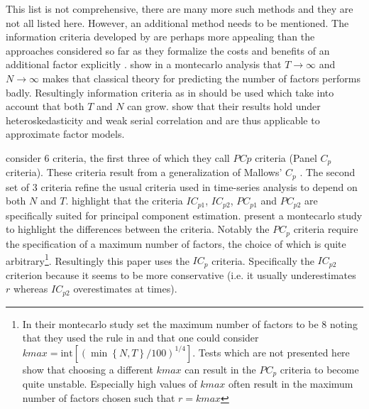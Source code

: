\documentclass[12pt]{article}
\begin{document}
This list is not comprehensive, there are many more such methods and they are not all listed here. However, an additional method needs to be mentioned. The information criteria developed by \citet{bai2002determining} are perhaps more appealing than the approaches considered so far as they formalize the costs and benefits of an additional factor explicitly \citep{stock2011dynamic}. \citet{cragg1997inferring} show in a montecarlo analysis that $T\rightarrow\infty$ and $N\rightarrow\infty$ makes that classical theory for predicting the number of factors performs badly. Resultingly information criteria as in \citet{bai2002determining} should be used which take into account that both $T$ and $N$ can grow. \citet{bai2002determining} show that their results hold under heteroskedasticity and weak serial correlation and are thus applicable to approximate factor models.

\citet{bai2002determining} consider $6$ criteria, the first three of which they call $PCp$ criteria (Panel $C_p$ criteria). These criteria result from a generalization of Mallows' $C_p$ \citep{mallows1973some}. The second set of $3$ criteria refine the usual criteria used in time-series analysis to depend on both $N$ and $T$. \citet{bai2002determining} highlight that the criteria $IC_{p1}$, $IC_{p2}$, $PC_{p1}$ and $PC_{p2}$ are specifically suited for principal component estimation. \citet{bai2002determining} present a montecarlo study to highlight the differences between the criteria. Notably the $PC_{p}$ criteria require the specification of a maximum number of factors, the choice of which is quite arbitrary\footnote{In their montecarlo study \citet{bai2002determining} set the maximum number of factors to be $8$ noting that they used the rule in \citet{schwert2002tests} and that one could consider $kmax=\text{int}[(\min\left\{N, T\right\}/100)^{1/4}]$. Tests which are not presented here show that choosing a different $kmax$ can result in the $PC_p$ criteria to become quite unstable. Especially high values of $kmax$ often result in the maximum number of factors chosen such that $r=kmax$}. Resultingly this paper uses the $IC_p$ criteria. Specifically the $IC_{p2}$ criterion because it seems to be more conservative (i.e. it usually underestimates $r$ whereas $IC_{p2}$ overestimates at times). 
\end{document}

